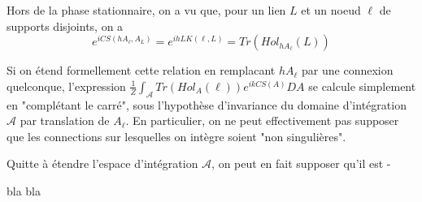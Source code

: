 \documentclass[10pt]{article}
\begin{document}
Hors de la phase stationnaire, on a vu que, pour un lien $L$ et un noeud $\ell$ de supports disjoints, on a\[e^{i CS(h A_\ell,A_{L}) }=e^{ih LK(\ell,L)}=Tr(Hol_{h A_\ell}(L))\]

Si on étend formellement cette relation en remplacant $h A_\ell$ par une connexion quelconque, l'expression $\frac{1}{Z}\int_{\mathcal{A}} Tr(Hol_A(\ell)) e^{i k CS(A)} DA$ se calcule simplement en "complétant le carré", sous l'hypothèse d'invariance du domaine d'intégration $\mathcal{A}$ par translation de $A_\ell$. En particulier, on ne peut effectivement pas supposer que les connections sur lesquelles on intègre soient "non singulières".

Quitte à étendre l'espace d'intégration $\mathcal{A}$, on peut en fait supposer qu'il est -





bla
bla








\newpage







\end{document}
